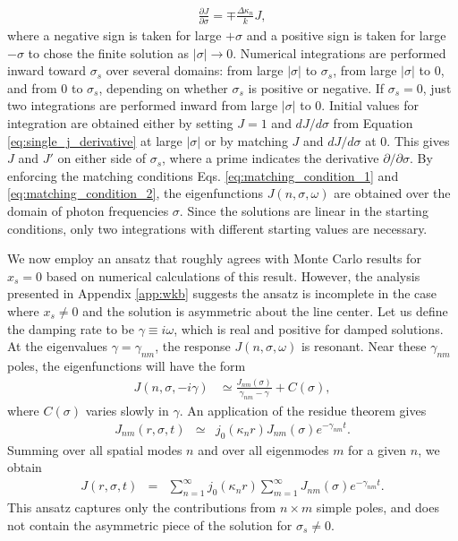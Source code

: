 \documentclass{aastex63}
\newcommand{\be}{\begin{eqnarray}}
\newcommand{\ee}{\end{eqnarray}}
\begin{document}
\be \label{eq:single_j_derivative}
\frac{\partial J}{\partial \sigma} = \mp \frac{\Delta\kappa_n}{k} J,
\ee
where a negative sign is taken for large $+\sigma$ and a positive sign is taken for large $-\sigma$ to chose the finite solution as $|\sigma|\to 0$. Numerical integrations are performed inward toward $\sigma_s$ over several domains: from large $|\sigma|$ to $\sigma_s$, from large $|\sigma|$ to 0, and from 0 to $\sigma_s$, depending on whether $\sigma_s$ is positive or negative. If $\sigma_s=0$, just two integrations are performed inward from large $|\sigma|$ to 0. Initial values for integration are obtained either by setting $J=1$ and $dJ/d\sigma$ from Equation \ref{eq:single_j_derivative} at large $|\sigma|$ or by matching $J$ and $dJ/d\sigma$ at 0. This gives $J$ and $J'$ on either side of $\sigma_s$, where a prime indicates the derivative $\partial/\partial \sigma$. By enforcing the matching conditions Eqs. \ref{eq:matching_condition_1} and \ref{eq:matching_condition_2}, the eigenfunctions $J(n, \sigma, \omega)$ are obtained over the domain of photon frequencies $\sigma$. Since the solutions are linear in the starting conditions, only two integrations with different starting values are necessary.

We now employ an ansatz that roughly agrees with Monte Carlo results for $x_s=0$ based on numerical calculations of this result. However, the analysis presented in Appendix \ref{app:wkb} suggests the ansatz is incomplete in the case where $x_s \neq 0$ and the solution is asymmetric about the line center. Let us define the damping rate to be $\gamma \equiv i\omega$, which is real and positive for damped solutions. At the eigenvalues $\gamma=\gamma_{nm}$, the response $J(n, \sigma, \omega)$ is resonant. Near these $\gamma_{nm}$ poles, the eigenfunctions will have the form 
\be \label{eq:jnsigmaomega_approx}
J(n,\sigma,-i\gamma) & \simeq \frac{ J_{nm}(\sigma) }{\gamma_{nm} - \gamma} + C(\sigma),
\ee
where $C(\sigma)$ varies slowly in $\gamma$. An application of the residue theorem gives
\be
J_{nm}(r,\sigma,t) & \simeq & j_0(\kappa_n r) J_{nm}(\sigma) e^{-\gamma_{nm}t}.
\ee
Summing over all spatial modes $n$ and over all eigenmodes $m$ for a given $n$, we obtain
\be \label{eq:Jrsigmat}
J(r,\sigma,t) & = & \sum_{n=1}^\infty j_0(\kappa_n r)  \sum_{m=1}^{\infty} J_{nm}(\sigma) e^{-\gamma_{nm}t}.
\ee
This ansatz captures only the contributions from $n \times m$ simple poles, and does not contain the asymmetric piece of the solution for $\sigma_s \neq 0$.
\end{document}
